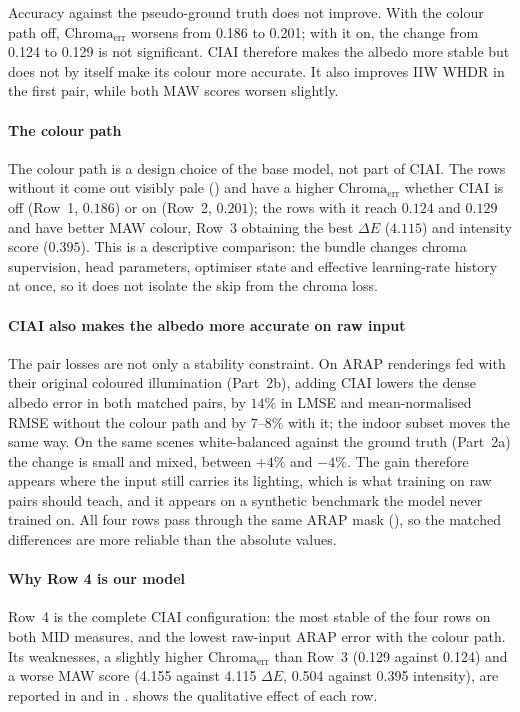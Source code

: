 Accuracy against the pseudo-ground truth does not improve. With the colour path off,
$\text{Chroma}_{\text{err}}$ worsens from 0.186 to 0.201; with it on, the change from 0.124 to
0.129 is not significant. CIAI therefore makes the albedo more stable but does not by itself
make its colour more accurate. It also improves IIW WHDR in the first pair, while both MAW
scores worsen slightly.

\paragraph{The colour path}
The colour path is a design choice of the base model, not part of CIAI. The rows without it
come out visibly pale () and have a higher $\text{Chroma}_{\text{err}}$
whether CIAI is off (Row~1, $0.186$) or on (Row~2, $0.201$); the rows with it reach $0.124$ and
$0.129$ and have better MAW colour, Row~3 obtaining the best $\Delta E$
($4.115$) and intensity score ($0.395$). This is a descriptive comparison: the bundle
changes chroma supervision, head parameters, optimiser state and effective learning-rate
history at once, so it does not isolate the skip from the chroma loss.

\paragraph{CIAI also makes the albedo more accurate on raw input}
The pair losses are not only a stability constraint. On ARAP renderings fed with their
original coloured illumination (Part~2b), adding CIAI lowers the dense albedo error in both
matched pairs, by $14\%$ in LMSE and mean-normalised RMSE without the colour path and by
$7$--$8\%$ with it; the indoor subset moves the same way. On the same scenes white-balanced
against the ground truth (Part~2a) the change is small and mixed, between $+4\%$ and $-4\%$. The gain therefore
appears where the input still carries its lighting, which is what training on raw pairs
should teach, and it appears on a synthetic benchmark the model never trained on. All four
rows pass through the same ARAP mask (), so the matched differences
are more reliable than the absolute values.

\paragraph{Why Row 4 is our model}
Row~4 is the complete CIAI configuration: the most stable of the four rows on both MID
measures, and the lowest raw-input ARAP
error with the colour path. Its weaknesses, a slightly higher $\text{Chroma}_{\text{err}}$ than
Row~3 (0.129 against 0.124) and a worse MAW score (4.155 against 4.115 $\Delta E$, 0.504 against
0.395 intensity), are reported in  and in .
 shows the qualitative effect of each row.

